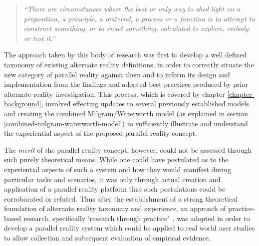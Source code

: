 \begin{quote}
	\textit{``There are circumstances where the best or only way to shed light on a proposition, a principle, a material, a process or a function is to attempt to construct something, or to enact something, calculated to explore, embody or test it.''}~\cite{Archer1995}
\end{quote}


The approach taken by this body of research was first to develop a well defined taxonomy of existing alternate reality definitions, in order to correctly situate the new category of parallel reality against them and to inform its design and implementation from the findings and adopted best practices produced by prior alternate reality investigation. This process, which is covered by chapter \ref{chapter-background}, involved effecting updates to several previously established models and creating the combined Milgram/Waterworth model (as explained in section \ref{combined-milgram-waterworth-model}) to sufficiently illustrate and understand the experiential aspect of the proposed parallel reality concept.

The \textit{merit} of the parallel reality concept, however, could not be assessed through such purely theoretical means. While one could have postulated as to the experiential aspects of such a system and how they would manifest during particular tasks and scenarios, it was only through actual creation and application of a parallel reality platform that such postulations could be corroborated or refuted. Thus after the establishment of a strong theoretical foundation of alternate reality taxonomy and experience, an approach of practice-based research, specifically `research through practice'~\cite{Chynoweth2014}, was adopted in order to develop a parallel reality system which could be applied to real world user studies to allow collection and subsequent evaluation of empirical evidence.

